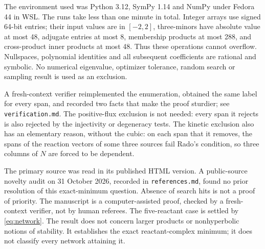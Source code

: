 \documentclass[11pt,a4paper]{report}
\begin{document}
The environment used was Python 3.12, SymPy 1.14 and NumPy under Fedora 44 in WSL. The runs take
less than one minute in total. Integer arrays use signed 64-bit entries; their input values are
in $[-2,2]$, three-minors have absolute value at most 48, adjugate entries at most 8, membership
products at most 288, and cross-product inner products at most 48. Thus these operations cannot
overflow. Nullspaces, polynomial identities and all subsequent coefficients are rational and symbolic.
No numerical eigenvalue, optimizer tolerance, random search or sampling result is used as an exclusion.

A fresh-context verifier reimplemented the enumeration, obtained the same label for every span, and recorded
two facts that make the proof sturdier; see \texttt{verification.md}. The positive-flux exclusion is
not needed: every span it rejects is also rejected by the injectivity or degeneracy tests. The kinetic
exclusion also has an elementary reason, without the cubic: on each span that it removes, the spans of the
reaction vectors of some three sources fail Rado's condition, so three columns of $N$ are forced to be dependent.

The primary source was read in its published HTML version. A public-source novelty audit on
31 October 2026, recorded in \texttt{references.md}, found no prior resolution of this exact-minimum question.
Absence of search hits is not a proof of priority. The manuscript is a computer-assisted proof, checked by
a fresh-context verifier, not by human referees. The five-reactant case is settled by \eqref{eq:network}.
The result does not concern larger products or nonhyperbolic notions of stability. It establishes
the exact reactant-complex minimum; it does not classify every network attaining it.
\paperreferences
\end{document}
